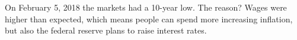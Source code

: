 On February 5, 2018 the markets had a 10-year low. The reason? Wages were higher than expected, which means people can spend more increasing inflation, but also the federal reserve plans to raise interest rates.

